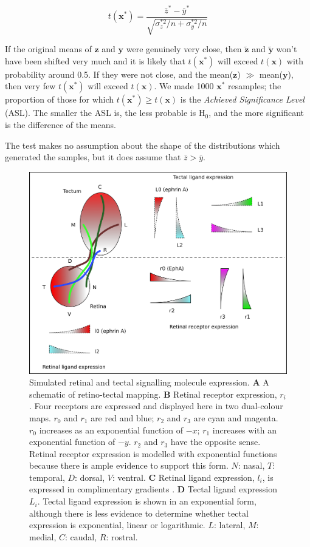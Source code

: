 \documentclass[11pt, a4paper]{article}
\begin{document}
$$t(\textbf{x}^*) =  \frac{\bar{z}^* - \bar{y}^*}{\sqrt{\sigma_{z}^{*2}/n + \sigma_{y}^{*2}/n} } $$

If the original means of $\textbf{z}$ and $\textbf{y}$ were genuinely very close, then $\tilde{\textbf{z}}$ and $\tilde{\textbf{y}}$ won't have been shifted very much and it is likely that $t(\textbf{x}^*)$ will exceed $t(\textbf{x})$ with probability around 0.5.
If they were not close, and the mean($\textbf{z}$) $\gg$ mean($\textbf{y}$), then very few $t(\textbf{x}^*)$ will exceed $t(\textbf{x})$.
We made 1000 $\textbf{x}^*$ resamples; the proportion of those for which $t(\textbf{x}^*) \geq t(\textbf{x})$ is the \emph{Achieved Significance Level} (ASL).
The smaller the ASL is, the less probable is H$_0$, and the more significant is the difference of the means.

The test makes no assumption about the shape of the distributions which generated the samples, but it does assume that $\bar{z} > \bar{y}$.

%
%

\begin{figure}
\includegraphics[width=\linewidth]{./images/expressions_fig.png}
\caption{Simulated retinal and tectal signalling molecule expression.
\textbf{A} A schematic of retino-tectal mapping.
%
\textbf{B} Retinal receptor expression, $r_i$. Four receptors are expressed and displayed here in two dual-colour maps. $r_0$ and $r_1$ are red and blue; $r_2$ and $r_3$ are cyan and magenta. $r_0$ increases as an exponential function of $-x$; $r_1$ increases with an exponential function of $-y$. $r_2$ and $r_3$ have the opposite sense. Retinal receptor expression is modelled with exponential functions because there is ample evidence to support this form. $N$: nasal, $T$: temporal, $D$: dorsal, $V$: ventral.
%
\textbf{C} Retinal ligand expression, $l_i$, is expressed in complimentary gradients \citep{hornberger_modulation_1999}.
%
\textbf{D} Tectal ligand expression $L_i$. Tectal ligand expression is shown in an exponential form, although there is less evidence to determine whether tectal expression is exponential, linear or logarithmic.
$L$: lateral, $M$: medial, $C$: caudal, $R$: rostral.
}
\label{f:ex}
\end{figure}
\end{document}
